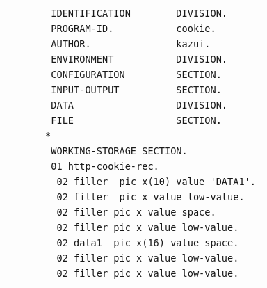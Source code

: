{\footnotesize
\begin{tabular}{|l|}
\hline
\vspace{-0.4em}\verb!       IDENTIFICATION        DIVISION.!\\
\vspace{-0.4em}\verb!       PROGRAM-ID.           cookie.!\\
\vspace{-0.4em}\verb!       AUTHOR.               kazui.!\\
\vspace{-0.4em}\verb!       ENVIRONMENT           DIVISION.!\\
\vspace{-0.4em}\verb!       CONFIGURATION         SECTION.!\\
\vspace{-0.4em}\verb!       INPUT-OUTPUT          SECTION.!\\
\vspace{-0.4em}\verb!       DATA                  DIVISION.!\\
\vspace{-0.4em}\verb!       FILE                  SECTION.!\\
\vspace{-0.4em}\verb!      *!\\
\vspace{-0.4em}\verb!       WORKING-STORAGE SECTION.!\\
\vspace{-0.4em}\verb!       01 http-cookie-rec.!\\
\vspace{-0.4em}\verb!        02 filler  pic x(10) value 'DATA1'.!\\
\vspace{-0.4em}\verb!        02 filler  pic x value low-value.!\\
\vspace{-0.4em}\verb!        02 filler pic x value space.!\\
\vspace{-0.4em}\verb!        02 filler pic x value low-value.!\\
\vspace{-0.4em}\verb!        02 data1  pic x(16) value space.!\\
\vspace{-0.4em}\verb!        02 filler pic x value low-value.!\\
\vspace{-0.4em}\verb!        02 filler pic x value low-value.!\\

\end{tabular}}
